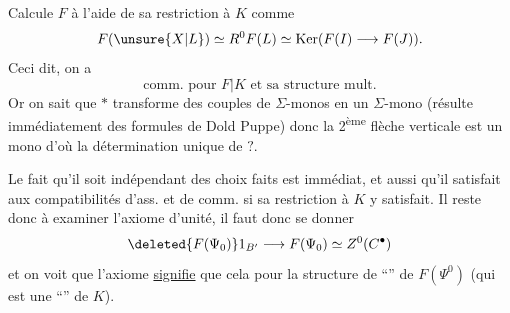 Calcule $F$ à l'aide de sa restriction à $K$ comme
\[
F(\unsure{X|L})\simeq R^0F(L)\simeq\operatorname{Ker}(F(I)\longrightarrow F(J)).
\]
Ceci dit, on a
\[
\text{comm. pour }F|K\text{ et sa structure mult.}
\]
Or on sait que \deleted{\unsure{$*$}} $*$ transforme des couples de $\Sigma$-monos en un $\Sigma$-mono (résulte immédiatement des formules de Dold Puppe) donc la 2\textsuperscript{ème} flèche verticale est un mono d'où la détermination unique de $?$.

Le fait qu'il soit indépendant des choix faits est immédiat, et aussi qu'il satisfait aux compatibilités d'ass. et de comm. si sa restriction à $K$ y satisfait. Il reste donc à examiner l'axiome d'unité,  il faut donc se donner
\[
\deleted{F(\Psi_0)}1_{B'}\longrightarrow F(\Psi_0)\simeq Z^0(C^\bullet)
\]
et on voit que l'axiome \uline{signifie} que cela  pour la structure de ``'' de $F(\Psi^0)$ (qui est une ``'' de $K$).


